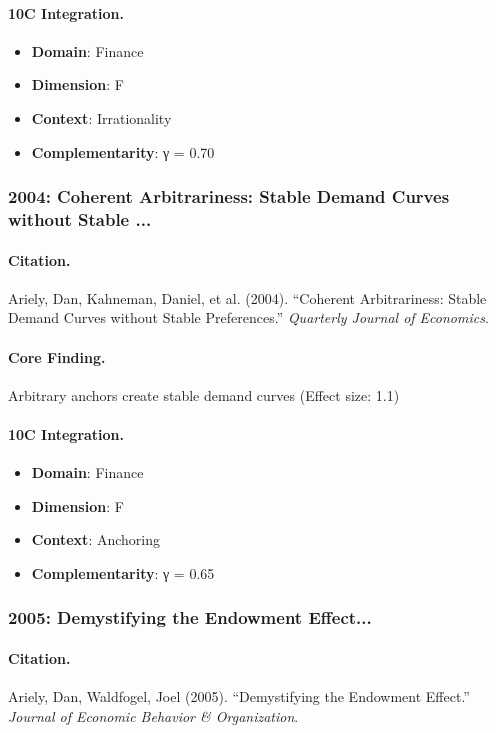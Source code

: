 \paragraph{10C Integration.}
\begin{itemize}[nosep]
  \item \textbf{Domain}: Finance
  \item \textbf{Dimension}: F
  \item \textbf{Context}: Irrationality
  \item \textbf{Complementarity}: γ = 0.70
\end{itemize}

\subsubsection{2004: Coherent Arbitrariness: Stable Demand Curves without Stable ...}

\paragraph{Citation.}
Ariely, Dan, Kahneman, Daniel, et al. (2004). ``Coherent Arbitrariness: Stable Demand Curves without Stable Preferences.''
\textit{Quarterly Journal of Economics}.

\paragraph{Core Finding.}
Arbitrary anchors create stable demand curves (Effect size: 1.1)

\paragraph{10C Integration.}
\begin{itemize}[nosep]
  \item \textbf{Domain}: Finance
  \item \textbf{Dimension}: F
  \item \textbf{Context}: Anchoring
  \item \textbf{Complementarity}: γ = 0.65
\end{itemize}

\subsubsection{2005: Demystifying the Endowment Effect...}

\paragraph{Citation.}
Ariely, Dan, Waldfogel, Joel (2005). ``Demystifying the Endowment Effect.''
\textit{Journal of Economic Behavior & Organization}.

